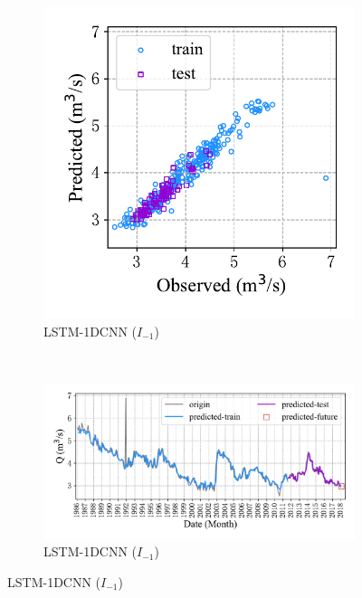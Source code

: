 \begin{figure}[!htbp]
  \centering
  \begin{subfigure}[b]{0.305\textwidth}
    \includegraphics[width=\textwidth]{Img/chap4_spr/out1/spr_scatter_in_1_out_1_lstm_cnn.pdf}
    \vspace{-1.2cm}
    \caption{LSTM-1DCNN ($I_{-1}$)}
    \label{fig:spr_scatter_in_1_out_1_lstm_cnn}
  \end{subfigure}
  ~
  \begin{subfigure}[b]{0.615\textwidth}
    \includegraphics[width=\textwidth]{Img/chap4_spr/out1/spr_series_in_1_out_1_lstm_cnn.pdf}
    \vspace{-1.2cm}
    \caption{LSTM-1DCNN ($I_{-1}$)}
    \label{fig:spr_series_in_1_out_1_lstm_cnn}

\end{subfigure}
\end{figure}
